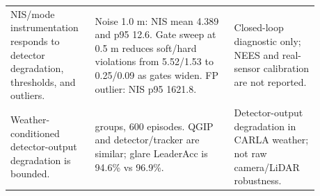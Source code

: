 \begin{tabular}{@{}>{\raggedright\arraybackslash}p{0.22\linewidth} >{\raggedright\arraybackslash}p{0.41\linewidth} >{\raggedright\arraybackslash}p{0.25\linewidth}@{}}
NIS/mode instrumentation responds to detector degradation, thresholds, and outliers. & Noise 1.0 m: NIS mean 4.389 and p95 12.6. Gate sweep at 0.5 m reduces soft/hard violations from 5.52/1.53 to 0.25/0.09 as gates widen. FP outlier: NIS p95 1621.8. & Closed-loop diagnostic only; NEES and real-sensor calibration are not reported. \\
Weather-conditioned detector-output degradation is bounded. & 6 groups, 600 episodes. QGIP and detector/tracker are similar; glare LeaderAcc is 94.6\% vs 96.9\%. & Detector-output degradation in CARLA weather; not raw camera/LiDAR robustness. \\
\bottomrule
\end{tabular}

